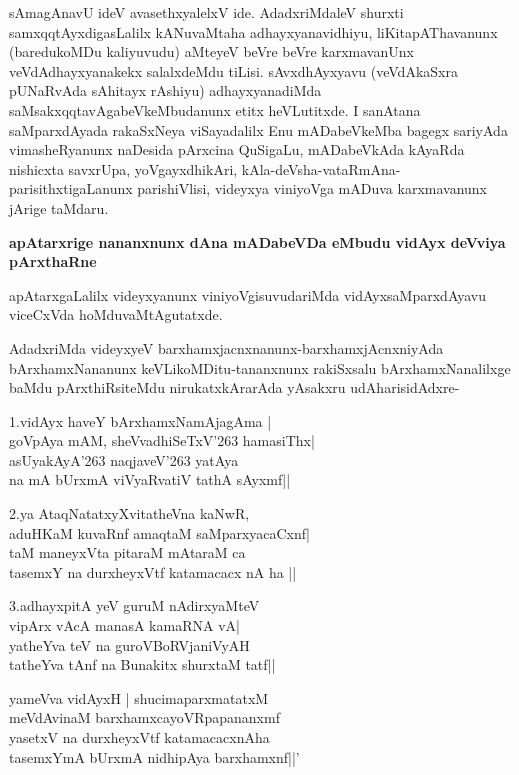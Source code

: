 sAmagAnavU ideV avasethxyalelxV ide. AdadxriMdaleV shurxti samxqqtAyxdigasLalilx kANuvaMtaha adhayxyanavidhiyu, liKitapAThavanunx (baredukoMDu kaliyuvudu) aMteyeV beVre beVre karxmavanUnx veVdAdhayxyanakekx salalxdeMdu tiLisi. sAvxdhAyxyavu (veVdAkaSxra pUNaRvAda sAhitayx rAshiyu) adhayxyanadiMda saMsakxqqtavAgabeVkeMbudanunx etitx heVLutitxde. I sanAtana saMparxdAyada rakaSxNeya viSayadalilx Enu mADabeVkeMba bagegx sariyAda vimasheRyanunx naDesida pArxcina QuSigaLu, mADabeVkAda kAyaRda nishicxta savxrUpa, yoVgayxdhikAri, kAla-deVsha-vataRmAna- parisithxtigaLanunx parishiVlisi, videyxya viniyoVga mADuva karxmavanunx jArige taMdaru.

\noindent
\textbf{apAtarxrige nananxnunx dAna mADabeVDa eMbudu vidAyx deVviya pArxthaRne}\label{page48}

apAtarxgaLalilx videyxyanunx viniyoVgisuvudariMda vidAyxsaMparxdAyavu viceCxVda hoMduvaMtAgutatxde.

AdadxriMda videyxyeV barxhamxjacnxnanunx-barxhamxjAcnxniyAda bArxhamxNananunx keVLikoMDitu-tananxnunx rakiSxsalu bArxhamxNanalilxge baMdu pArxthiRsiteMdu nirukatxkArarAda yAsakxru udAharisidAdxre-

\begin{shloka}
1.\qquad vidAyx haveY bArxhamxNamAjagAma |\\\label{48}
\qquad goVpAya mAM, sheVvadhiSeTxV\char'263 hamasiThx|\\
\qquad asUyakAyA\char'263 naqjaveV\char'263 yatAya\\
\qquad na mA bUrxmA viVyaRvatiV tathA sAyxmf||
\end{shloka}

\begin{shloka}
2.\qquad ya AtaqNatatxyXvitatheVna kaNwR,\\\label{48}
aduHKaM kuvaRnf amaqtaM saMparxyacaCxnf|\\
taM maneyxVta pitaraM mAtaraM ca \\
tasemxY na durxheyxVtf katamacacx nA ha ||
\end{shloka}

\begin{shloka}
3.\qquad adhayxpitA yeV guruM nAdirxyaMteV\\
\qquad vipArx vAcA manasA kamaRNA vA|\\
\qquad yatheYva teV na guroVBoRVjaniVyAH\\
\qquad tatheYva tAnf na Bunakitx shurxtaM tatf||
\end{shloka}

\begin{shloka}
yameVva vidAyxH | shucimaparxmatatxM\\
meVdAvinaM barxhamxcayoVRpapananxmf\\
yasetxV na durxheyxVtf katamacacxnAha\\
tasemxYmA bUrxmA nidhipAya barxhamxnf||'
\end{shloka}

